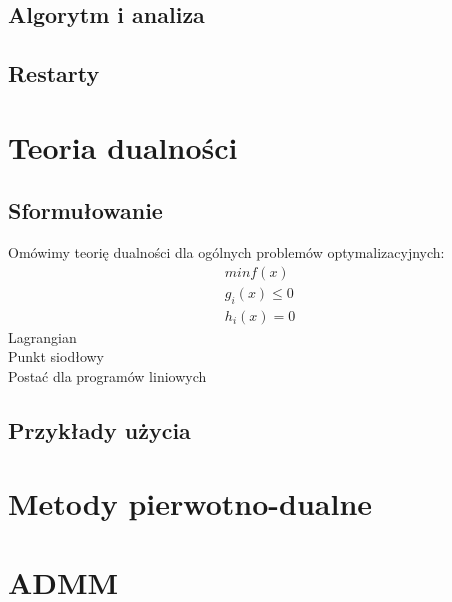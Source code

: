 \documentclass[10pt,a4paper,draft]{report}
\begin{document}
\section{Algorytm i analiza}

\section{Restarty}


\chapter{Teoria dualności}
\section{Sformułowanie}
Omówimy teorię dualności dla ogólnych problemów optymalizacyjnych:
\[
\begin{array}{c}
min f(x) \\
g_i(x) \leq 0 \\
h_i(x) = 0
\end{array}
\]
Lagrangian \\
Punkt siodłowy \\
Postać dla programów liniowych
\section{Przykłady użycia}


\chapter{Metody pierwotno-dualne}

\chapter{ADMM}
\end{document}
